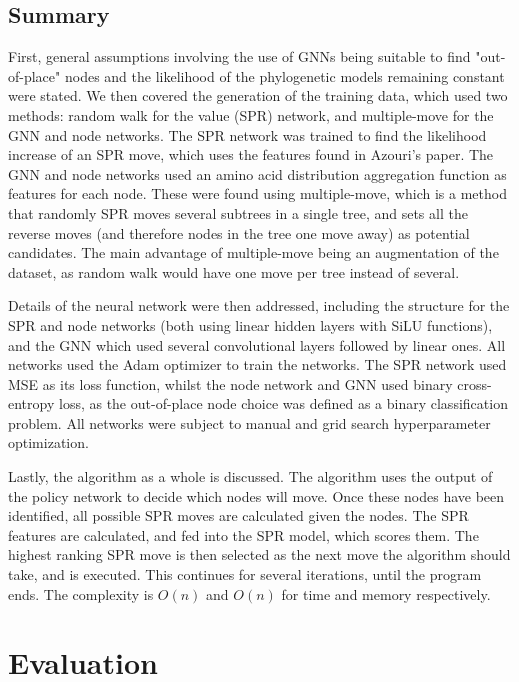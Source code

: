 \documentclass{mpaper}
\begin{document}
\subsection{Summary}

First, general assumptions involving the use of GNNs being suitable to find "out-of-place" nodes and the likelihood of the phylogenetic models remaining constant were stated. We then covered the generation of the training data, which used two methods: random walk for the value (SPR) network, and multiple-move for the GNN and node networks. The SPR network was trained to find the likelihood increase of an SPR move, which uses the features found in Azouri's paper. The GNN and node networks used an amino acid distribution aggregation function as features for each node. These were found using multiple-move, which is a method that randomly SPR moves several subtrees in a single tree, and sets all the reverse moves (and therefore nodes in the tree one move away) as potential candidates. The main advantage of multiple-move being an augmentation of the dataset, as random walk would have one move per tree instead of several.

Details of the neural network were then addressed, including the structure for the SPR and node networks (both using linear hidden layers with SiLU functions), and the GNN which used several convolutional layers followed by linear ones. All networks used the Adam optimizer to train the networks. The SPR network used MSE as its loss function, whilst the node network and GNN used binary cross-entropy loss, as the out-of-place node choice was defined as a binary classification problem. All networks were subject to manual and grid search hyperparameter optimization.

Lastly, the algorithm as a whole is discussed. The algorithm uses the output of the policy network to decide which nodes will move. Once these nodes have been identified, all possible SPR moves are calculated given the nodes. The SPR features are calculated, and fed into the SPR model, which scores them. The highest ranking SPR move is then selected as the next move the algorithm should take, and is executed. This continues for several iterations, until the program ends. The complexity is $O(n)$ and $O(n)$ for time and memory respectively.


\section{Evaluation}
\end{document}
